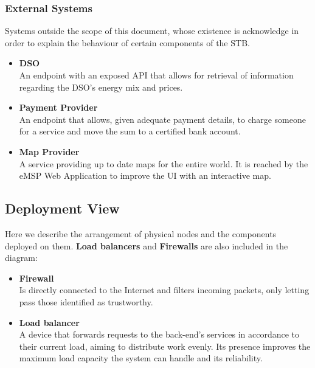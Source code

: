 \documentclass[11pt]{article}
\begin{document}
\subsubsection{External Systems}

Systems outside the scope of this document, whose existence is acknowledge in order to explain the behaviour of certain components of the STB.

\begin{itemize}
    \item \textbf{DSO} \\
        An endpoint with an exposed API that allows for retrieval of information regarding the DSO's energy mix and prices.
    \item \textbf{Payment Provider} \\
        An endpoint that allows, given adequate payment details, to charge someone for a service and move the sum to a certified bank account.
    \item \textbf{Map Provider} \\
        A service providing up to date maps for the entire world. It is reached by the eMSP Web Application to improve the UI with an interactive map.
\end{itemize}

\newpage

\subsection{Deployment View}

Here we describe the arrangement of physical nodes and the components deployed on them. \textbf{Load balancers} and \textbf{Firewalls} are also included in the diagram:
\begin{itemize}
    \item \textbf{Firewall} \\
        Is directly connected to the Internet and filters incoming packets, only letting pass those identified as trustworthy.
    \item \textbf{Load balancer} \\
        A device that forwards requests to the back-end's services in accordance to their current load, aiming to distribute work evenly. Its presence improves the maximum load capacity the system can handle and its reliability. 
\end{itemize}
\end{document}
